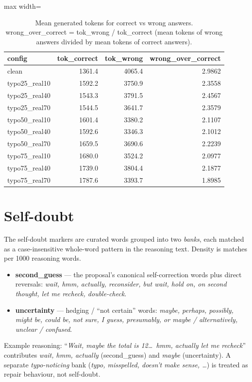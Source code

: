 \documentclass[11pt]{article}
\begin{document}
\begin{table}[H]
\centering
\caption{Mean generated tokens for correct vs wrong answers. wrong\_over\_correct = tok\_wrong / tok\_correct (mean tokens of wrong answers divided by mean tokens of correct answers).}
\small
\begin{adjustbox}{max width=\textwidth}
\begin{tabular}{lrrr}
\toprule
\textbf{config} & \textbf{tok\_correct} & \textbf{tok\_wrong} & \textbf{wrong\_over\_correct} \\
\midrule
clean & 1361.4 & 4065.4 & 2.9862 \\
typo25\_real10 & 1592.2 & 3750.9 & 2.3558 \\
typo25\_real40 & 1543.3 & 3791.5 & 2.4567 \\
typo25\_real70 & 1544.5 & 3641.7 & 2.3579 \\
typo50\_real10 & 1601.4 & 3380.2 & 2.1107 \\
typo50\_real40 & 1592.6 & 3346.3 & 2.1012 \\
typo50\_real70 & 1659.5 & 3690.6 & 2.2239 \\
typo75\_real10 & 1680.0 & 3524.2 & 2.0977 \\
typo75\_real40 & 1739.0 & 3804.4 & 2.1877 \\
typo75\_real70 & 1787.6 & 3393.7 & 1.8985 \\
\bottomrule
\end{tabular}
\end{adjustbox}
\end{table}

\section*{Self-doubt}
\noindent The self-doubt markers are curated words grouped into two
\emph{banks}, each matched as a case-insensitive whole-word pattern in the reasoning
text. Density is matches per 1000 reasoning words.
\begin{itemize}\setlength{\itemsep}{1pt}
  \item \textbf{second\_guess} --- the proposal's canonical self-correction words plus
  direct reversals: \emph{wait, hmm, actually, reconsider, but wait, hold on, on second
  thought, let me recheck, double-check}.
  \item \textbf{uncertainty} --- hedging / ``not certain'' words: \emph{maybe, perhaps,
  possibly, might be, could be, not sure, I guess, presumably, or maybe / alternatively,
  unclear / confused}.
\end{itemize}
\noindent Example reasoning: ``\emph{Wait, maybe the total is 12\dots\ hmm, actually let
me recheck}'' contributes \emph{wait, hmm, actually} (second\_guess) and \emph{maybe}
(uncertainty). A separate \emph{typo-noticing} bank (\emph{typo, misspelled, doesn't make
sense, \dots}) is treated as repair behaviour, not self-doubt.
\medskip
\end{document}
